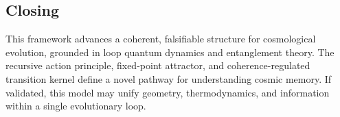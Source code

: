 \subsection{Closing}

This framework advances a coherent, falsifiable structure for cosmological evolution, grounded in loop quantum dynamics and entanglement theory. The recursive action principle, fixed-point attractor, and coherence-regulated transition kernel define a novel pathway for understanding cosmic memory. If validated, this model may unify geometry, thermodynamics, and information within a single evolutionary loop.
